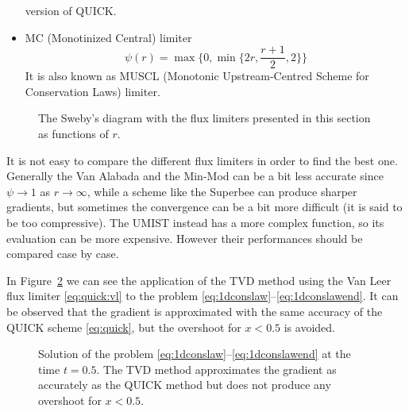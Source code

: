 \begin{itemize}
	version of QUICK.
%
	\item MC (Monotinized Central) limiter \cite{tvd:mclimiter}
	\begin{equation} \label{eq:mclim}
	\psi(r)=\max \bigg\{0, \min \bigg\{ 2r, \frac{r+1}{2}, 2\bigg\} \bigg\}
	\end{equation}
	It is also known as MUSCL (Monotonic Upstream-Centred Scheme for 
	Conservation Laws) limiter.
%	
\end{itemize}
\begin{figure}[t]
	\centering
	
	\caption[Flux limiter functions]{The Sweby's diagram with the flux limiters 
	presented in this section as functions of $r$.}
	\label{fig:fluxlimiters}
\end{figure}

It is not easy to compare the different flux limiters in order to find the 
best one. Generally the Van Alabada and the Min-Mod can be a bit less accurate 
since $\psi \rightarrow 1$ as $r \rightarrow \infty$, while a scheme like the 
Superbee can produce sharper gradients, but sometimes the convergence can be a 
bit more difficult (it is said to be too compressive). The UMIST instead has a 
more complex function, so its evaluation can be more expensive. However their 
performances should be compared case by case.

In Figure~\ref{fig:1dconslawtvd} we can see the application of the TVD method 
using the Van Leer flux limiter \eqref{eq:quick:vl} to the problem 
\eqref{eq:1dconslaw}--\eqref{eq:1dconslawend}. It can be observed that the 
gradient is approximated with the same accuracy of the QUICK scheme 
\eqref{eq:quick}, but the overshoot for $x<0.5$ is avoided.
\begin{figure}
	\centering
	
	\caption[Solution of a one-dimensional scalar conservation law with the TVD 
	method]{Solution of the problem 
	\eqref{eq:1dconslaw}--\eqref{eq:1dconslawend} at the time 
	$t=0.5$. The TVD method approximates the gradient as accurately as the 
	QUICK method but does not produce any overshoot for $x<0.5$.}
	\label{fig:1dconslawtvd}
\end{figure}
%

